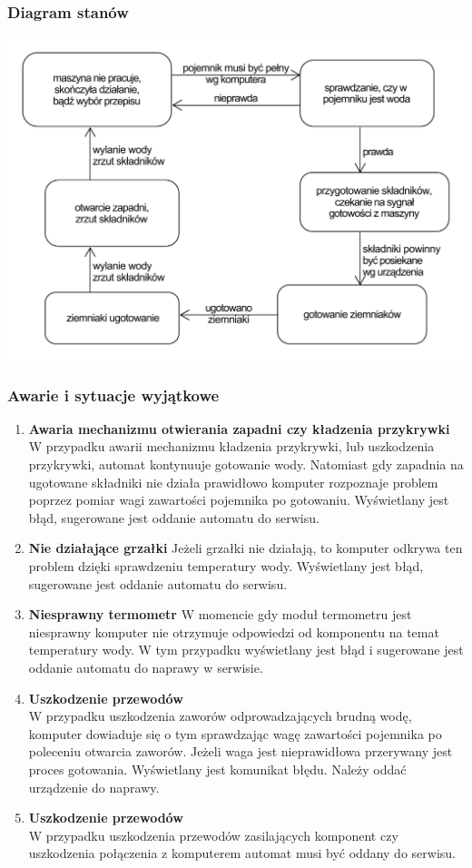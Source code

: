 \documentclass[12pt,a4paper,notitlepage]{article}
\begin{document}
\subsubsection{Diagram stanów}
\includegraphics[width=\textwidth,height=\textheight,keepaspectratio=true]{Diagram-stanow-pojemnik-na-ziemniaki.pdf}

\subsubsection{Awarie i sytuacje wyjątkowe}
\begin{enumerate}
  \item \textbf{Awaria mechanizmu otwierania zapadni czy kładzenia przykrywki}
W przypadku awarii mechanizmu kładzenia przykrywki, lub uszkodzenia przykrywki, automat kontynuuje gotowanie wody. Natomiast gdy zapadnia na ugotowane składniki nie działa prawidłowo komputer rozpoznaje problem poprzez pomiar wagi zawartości pojemnika po gotowaniu. Wyświetlany jest błąd, sugerowane jest oddanie automatu do serwisu.
  \item \textbf{Nie działające grzałki}
Jeżeli grzałki nie działają, to komputer odkrywa ten problem dzięki sprawdzeniu temperatury wody. Wyświetlany jest błąd, sugerowane jest oddanie automatu do serwisu.
  \item \textbf{Niesprawny termometr}
W momencie gdy moduł termometru jest niesprawny komputer nie otrzymuje odpowiedzi od komponentu na temat temperatury wody. W tym przypadku wyświetlany jest błąd i sugerowane jest oddanie automatu do naprawy w serwisie.
  \item \textbf{Uszkodzenie przewodów}\\
W przypadku uszkodzenia zaworów odprowadzających brudną wodę, komputer dowiaduje się o tym sprawdzając wagę zawartości pojemnika po poleceniu otwarcia zaworów. Jeżeli waga jest nieprawidłowa przerywany jest proces gotowania. Wyświetlany jest komunikat błędu. Należy oddać urządzenie do naprawy.
  \item \textbf{Uszkodzenie przewodów}\\
W przypadku uszkodzenia przewodów zasilających komponent czy uszkodzenia połączenia z komputerem automat musi być oddany do serwisu.
\end{enumerate}
\end{document}
